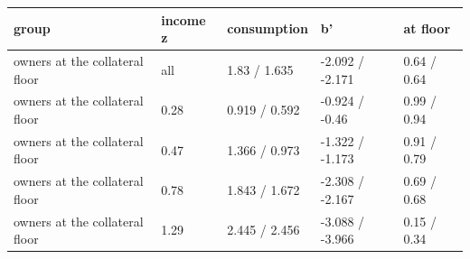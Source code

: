 \begingroup\small
\setlength{\tabcolsep}{3pt}
\renewcommand{\arraystretch}{1.04}
\begin{tabularx}{\linewidth}{XXXXX}
\toprule
group & income z & consumption & b' & at floor \\
\midrule
owners at the collateral floor & all & 1.83 / 1.635 & -2.092 / -2.171 & 0.64 / 0.64 \\
owners at the collateral floor & 0.28 & 0.919 / 0.592 & -0.924 / -0.46 & 0.99 / 0.94 \\
owners at the collateral floor & 0.47 & 1.366 / 0.973 & -1.322 / -1.173 & 0.91 / 0.79 \\
owners at the collateral floor & 0.78 & 1.843 / 1.672 & -2.308 / -2.167 & 0.69 / 0.68 \\
owners at the collateral floor & 1.29 & 2.445 / 2.456 & -3.088 / -3.966 & 0.15 / 0.34 \\
\bottomrule
\end{tabularx}
\endgroup
